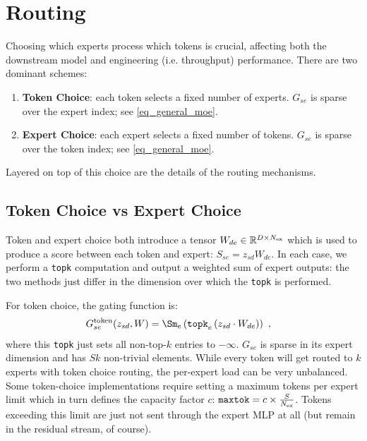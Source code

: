 \documentclass[11pt]{article}
\begin{document}
\section{Routing}


Choosing which experts process which tokens is crucial, affecting both the downstream model and
engineering (i.e. throughput) performance.  There are two dominant schemes:
\begin{enumerate}
    \item \textbf{Token Choice}: each token selects a fixed number of experts. $ G _{ se } $
         is sparse over the expert index; see \eqref{eq_general_moe}.
    \item \textbf{Expert Choice}: each expert selects a fixed number of tokens. $ G _{ se } $ is
        sparse over the token index; see \eqref{eq_general_moe}.
\end{enumerate}
Layered on top of this choice are the details of the routing mechanisms.

\subsection{Token Choice vs Expert Choice}

Token and expert choice both introduce a tensor $W _{ de } \in \mathbb{R} ^{ D\times N _{ {\rm  ex}
} }$ which is used to produce a score between each token and expert: $ S _{ se } = z _{ sd } W _{ de
} $. In each case, we perform a \texttt{topk} computation and output a weighted sum of expert
outputs: the two methods just differ in the dimension over which the \texttt{topk} is performed.

For token choice, the gating function is:
\begin{align}
    G  ^{ {\rm  token} }_{ se }(z _{ sd }, W)  &= \Sm_{ e } \left ( \texttt{topk} _{ e } \left ( z _{ sd } \cdot W _{ de }  \right ) \right ) \ , \label{eq_token_choice}
\end{align}
where this \texttt{topk} just sets all non-top-$ k $ entries to $ -\infty $. $ G _{ se } $
is sparse in its expert dimension and has $ Sk $ non-trivial elements. While every token will get
routed to $ k $ experts with token choice routing, the per-expert load can be very unbalanced. Some
token-choice implementations require setting a maximum tokens per expert limit which in turn defines
the capacity factor $ c $: $ \texttt{maxtok} = c \times \frac{ S }{ N _{ {\rm ex} } } $. Tokens
exceeding this limit are just not sent through the expert MLP at all (but remain in the residual
stream, of course).
\end{document}
